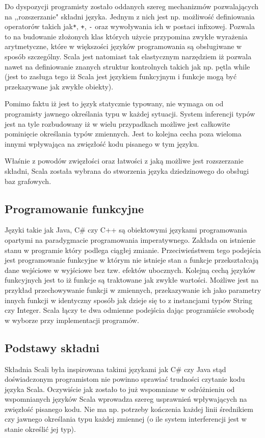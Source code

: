 \documentclass[brudnopis]{xmgr}
\begin{document}
Do dyspozycji programisty zostało oddanych szereg mechanizmów pozwalających na ,,rozszerzanie" składni języka. Jednym z nich jest np. możliwość definiowania operatorów takich jak\texttt{*}, \texttt{+}, \texttt{-} oraz wywoływania ich w postaci infixowej. Pozwala to na budowanie złożonych klas których użycie przypomina zwykłe wyrażenia arytmetyczne, które w większości języków programowania są obsługiwane w sposób szczególny. Scala jest natomiast tak elastycznym narzędziem iż pozwala nawet na definiowanie znanych struktur kontrolnych takich jak np. pętla while (jest to zasługa tego iż Scala jest językiem funkcyjnym i funkcje mogą być przekazywane jak zwykłe obiekty).

Pomimo faktu iż jest to język statycznie typowany, nie wymaga on od programisty jawnego określania typu w każdej sytuacji. System inferencji typów jest na tyle rozbudowany iż w wielu przypadkach możliwe jest całkowite pominięcie określania typów zmiennych. Jest to kolejna cecha poza wieloma innymi wpływająca na zwięzłość kodu pisanego w tym języku.

Właśnie z powodów zwięzłości oraz łatwości z jaką możliwe jest rozszerzanie składni, Scala została wybrana do stworzenia języka dziedzinowego do obsługi baz grafowych.

\subsection{Programowanie funkcyjne}

Języki takie jak Java, C\# czy C++ są obiektowymi językami programowania opartymi na paradygmacie programowania imperatywnego. Zakłada on istnienie stanu w programie który podlega ciągłej zmianie. Przeciwieństwem tego podejścia jest programowanie funkcyjne w którym nie istnieje stan a funkcje przekształcają dane wejściowe w wyjściowe bez tzw. efektów ubocznych. Kolejną cechą języków funkcyjnych jest to iż funkcje są traktowane jak zwykłe wartości. Możliwe jest na przykład przechowywanie funkcji w zmiennych, przekazywanie ich jako parametry innych funkcji w identyczny sposób jak dzieje się to z instancjami typów String czy Integer. Scala łączy te dwa odmienne podejścia dając programiście swobodę w wyborze przy implementacji programów.

\subsection{Podstawy składni}
Składnia Scali była inspirowana takimi językami jak C\# czy Java stąd doświadczonym programistom nie powinno sprawiać trudności czytanie kodu języka Scala. Oczywiście jak zostało to już wspomniane w odróżnieniu od wspomnianych języków Scala wprowadza szereg usprawnień wpływających na zwięzłość pisanego kodu. Nie ma np. potrzeby kończenia każdej linii średnikiem czy jawnego określania typu każdej zmiennej (o ile system interferencji jest w stanie określić jej typ).
\end{document}
